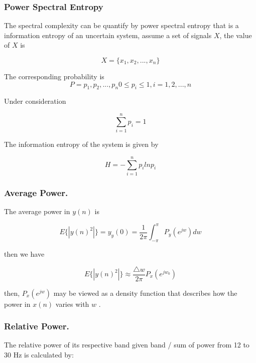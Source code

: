 \documentclass[letterpaper,12pt,openright,oneside]{article}
\begin{document}
\subsubsection{Power Spectral Entropy}
The spectral complexity can be quantify by power spectral entropy that is a information entropy of an uncertain system, assume a set of signals $X$, the value of $X$ is \citep{lz}

\begin{equation}
X = \{x_1,x_2,...,x_n\}   
\end{equation}

The corresponding probability is 
\begin{equation}
P = {p_1, p_2,...,p_n} 0 \leq p_i \leq 1, i = 1,2,...,n 
\end{equation}

Under consideration

\begin{equation}
\sum_{i=1}^n p_i = 1
\end{equation}

The information entropy of the system is given by

\begin{equation}
H = -\sum_{i=1}^n p_i ln p_i
\end{equation}


\subsubsection{Average Power.}
The average power in $y(n)$ is

\begin{equation}
E \{ |y(n)^2 |\} = y_{y}(0) = \frac{1}{2\pi} \int_{-\pi}^\pi P_y (e^{jw}) dw
\end{equation}

then we have

\begin{equation}
E \{ |y(n)^2 |\} \approx \frac{\bigtriangleup w}{2 \pi} P_x (e^{jw_0})
\end{equation}

then, $P_x (e^{jw})$ may be viewed as a density function that describes how the power in $x(n)$ varies with $w$ \cite{sds}.\\


\subsubsection{Relative Power.}
The relative power of its respective band given band / sum of power from 12 to 30 Hz is calculated by:
\end{document}
